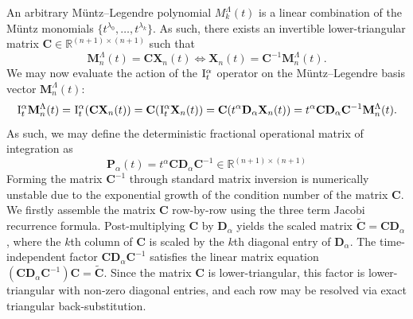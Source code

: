 \documentclass[11pt, a4paper]{article}
\theoremstyle{theoremstyle}
\theoremstyle{definitionstyle}
\begin{document}
An arbitrary M\"untz--Legendre polynomial $M_k^\Lambda(t)$ is a linear combination of the M\"untz monomials $\{t^{\lambda_0}, \dots , t^{\lambda_k}\}$. As such, there exists an invertible lower-triangular matrix $\mathbf C \in \mathbb R^{(n+1) \times (n+1)}$ such that
\begin{equation}
    \mathbf M_n^\Lambda(t) = \mathbf C \mathbf X_n(t) \iff \mathbf X_n(t) = \mathbf C^{-1}\mathbf M_n^\Lambda(t).
\end{equation}
We may now evaluate the action of the $\II$ operator on the M\"untz--Legendre basis vector $\mathbf M_n^\Lambda(t)$:
\begin{equation}
    \II \mathbf M_n^\Lambda(t) = \II(\mathbf C\mathbf X_n(t)) = \mathbf C(\II \mathbf X_n(t)) = \mathbf C(t^\alpha\mathbf D_\alpha\mathbf X_n(t)) = t^\alpha\mathbf C \mathbf D_\alpha \mathbf C^{-1}\mathbf M_n^\Lambda(t).
\end{equation}
As such, we may define the deterministic fractional operational matrix of integration as
\begin{equation}
    \mathbf P_\alpha(t) = t^{\alpha}\mathbf C \mathbf D_\alpha \mathbf C^{-1} \in \mathbb R^{(n+1) \times (n+1)}
\end{equation}
Forming the matrix $\mathbf C^{-1}$ through standard matrix inversion is numerically unstable due to the exponential growth of the condition number of the matrix $\mathbf C$. We firstly assemble the matrix $\mathbf C$ row-by-row using the three term Jacobi recurrence formula. Post-multiplying $\mathbf C$ by $\mathbf D_\alpha$ yields the scaled matrix $\tilde{\mathbf C} = \mathbf C \mathbf D_\alpha$, where the $k$th column of $\mathbf C$ is scaled by the $k$th diagonal entry of $\mathbf D_\alpha$. The time-independent factor $\mathbf C \mathbf D_\alpha \mathbf C^{-1}$ satisfies the linear matrix equation $(\mathbf C \mathbf D_\alpha \mathbf C^{-1}) \mathbf C = \tilde{\mathbf C}$. Since the matrix $\mathbf C$ is lower-triangular, this factor is lower-triangular with non-zero diagonal entries, and each row may be resolved via exact triangular back-substitution.
\end{document}
